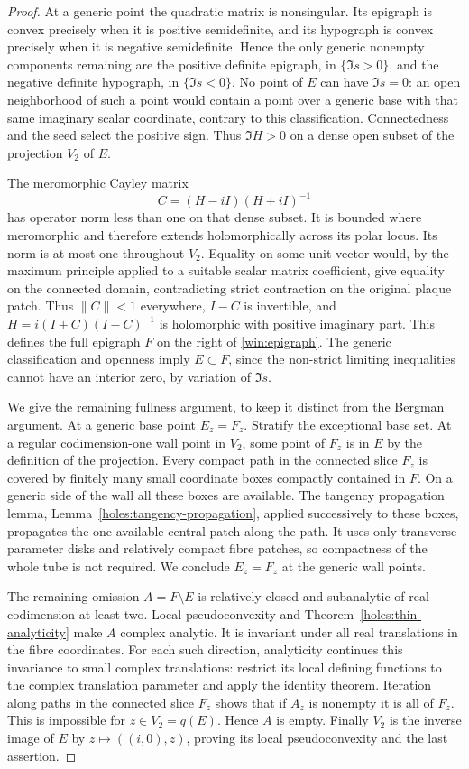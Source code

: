 \begin{proof}
At a generic point the quadratic matrix is nonsingular.  Its epigraph
is convex precisely when it is positive semidefinite, and its hypograph
is convex precisely when it is negative semidefinite.  Hence the only
generic nonempty components remaining are the positive definite
epigraph, in $\{\Im s>0\}$, and the negative definite hypograph, in
$\{\Im s<0\}$.  No point of $E$ can have $\Im s=0$: an open
neighborhood of such a point would contain a point over a generic
base with that same imaginary scalar coordinate, contrary to this
classification.  Connectedness and the seed select the positive sign.
Thus $\Im H>0$ on a dense open subset of the projection $V_2$ of $E$.

The meromorphic Cayley matrix
\[
                    C=(H-iI)(H+iI)^{-1}
\]
has operator norm less than one on that dense subset.  It is bounded
where meromorphic and therefore extends holomorphically across its
polar locus.  Its norm is at most one throughout $V_2$.  Equality on
some unit vector would, by the maximum principle applied to a suitable
scalar matrix coefficient, give equality on the connected domain,
contradicting strict contraction on the original plaque patch.  Thus
$\|C\|<1$ everywhere, $I-C$ is invertible, and
$H=i(I+C)(I-C)^{-1}$ is holomorphic with positive imaginary part.
This defines the full epigraph $F$ on the right of
\eqref{win:epigraph}.  The generic classification and openness imply
$E\subset F$, since the non-strict limiting inequalities cannot have
an interior zero, by variation of $\Im s$.

We give the remaining fullness argument, to keep it distinct from the
Bergman argument.  At a generic base point $E_z=F_z$.  Stratify the
exceptional base set.  At a regular codimension-one wall point in
$V_2$, some point of $F_z$ is in $E$ by the definition of the projection.
Every compact path in the connected slice $F_z$ is covered by finitely
many small coordinate boxes compactly contained in $F$.  On a generic
side of the wall all these boxes are available.  The tangency
propagation lemma, Lemma~\ref{holes:tangency-propagation}, applied
successively to these boxes, propagates the one available central
patch along the path.  It uses only transverse parameter disks and
relatively compact fibre patches, so compactness of the whole tube
is not required.  We conclude $E_z=F_z$ at the generic wall points.

The remaining omission $A=F\setminus E$ is relatively closed and
subanalytic of real codimension at least two.  Local pseudoconvexity
and Theorem~\ref{holes:thin-analyticity} make $A$ complex analytic.
It is invariant under all real translations in the fibre coordinates.
For each such direction, analyticity continues this invariance to
small complex translations: restrict its local defining functions to
the complex translation parameter and apply the identity theorem.
Iteration along paths in the connected slice $F_z$ shows that if
$A_z$ is nonempty it is all of $F_z$.  This is impossible for
$z\in V_2=q(E)$.  Hence $A$ is empty.  Finally $V_2$ is the inverse
image of $E$ by $z\mapsto((i,0),z)$, proving its local pseudoconvexity
and the last assertion.
\end{proof}


